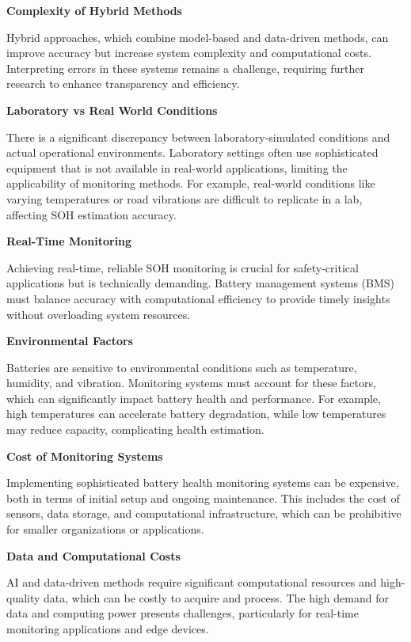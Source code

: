 \textbf{Complexity of Hybrid Methods}

Hybrid approaches, which combine model-based and data-driven methods, can improve accuracy but increase system complexity and computational costs. 
Interpreting errors in these systems remains a challenge, requiring further research to enhance transparency and efficiency.
\vspace{1cm}

\textbf{Laboratory vs Real World Conditions}

There is a significant discrepancy between laboratory-simulated conditions and actual operational environments. 
Laboratory settings often use sophisticated equipment that is not available in real-world applications, limiting the applicability of monitoring methods. For example, real-world conditions like varying temperatures or road vibrations are difficult to replicate in a lab, affecting SOH estimation accuracy.
\vspace{1cm}

\textbf{Real-Time Monitoring}

Achieving real-time, reliable SOH monitoring is crucial for safety-critical applications but is technically demanding. 
Battery management systems (BMS) must balance accuracy with computational efficiency to provide timely insights without overloading system resources.
\vspace{1cm}

\textbf{Environmental Factors}

Batteries are sensitive to environmental conditions such as temperature, humidity, and vibration. 
Monitoring systems must account for these factors, which can significantly impact battery health and performance. 
For example, high temperatures can accelerate battery degradation, while low temperatures may reduce capacity, complicating health estimation.
\vspace{1cm}

\textbf{Cost of Monitoring Systems}

Implementing sophisticated battery health monitoring systems can be expensive, both in terms of initial setup and ongoing maintenance. 
This includes the cost of sensors, data storage, and computational infrastructure, which can be prohibitive for smaller organizations or applications.
\vspace{1cm}

\textbf{Data and Computational Costs}

AI and data-driven methods require significant computational resources and high-quality data, which can be costly to acquire and process. 
The high demand for data and computing power presents challenges, particularly for real-time monitoring applications and edge devices.

